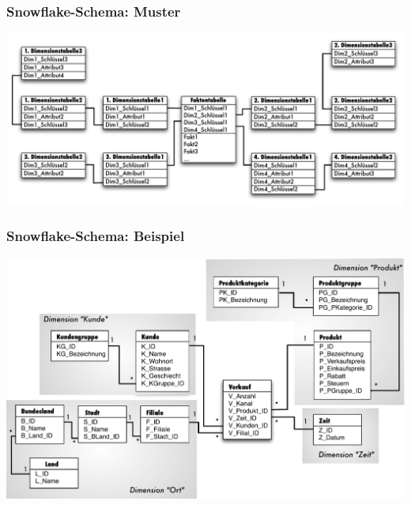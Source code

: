             \begin{frame}
        
            \frametitle{Snowflake-Schema: Muster}
        
            \begin{center}
              \includegraphics[width=\textwidth]{fig6/Snowflake-Schema.pdf}
            \end{center}
        
            \end{frame}
            \begin{frame}
        
            \frametitle{Snowflake-Schema: Beispiel}
        
            \begin{center}
              \includegraphics[height=\textAreaHeight,width=\textwidth,keepaspectratio]{fig6/SnowflakeSchema-Buch.pdf}
            \end{center}
        
            \end{frame}
        
